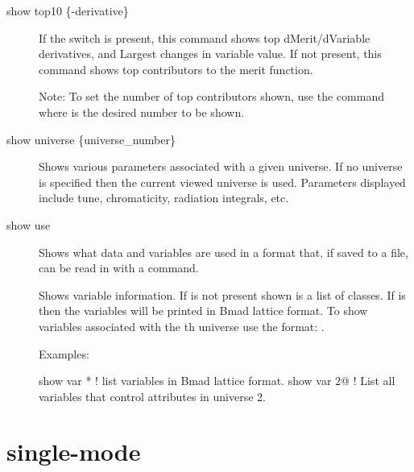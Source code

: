 {{{{\begin{description}
  \item[show top10 \{-derivative\}] \Newline
If the  switch is present, this command shows top
dMerit/dVariable derivatives, and Largest changes in variable value.
If not present, this command
shows top contributors to the merit function.

Note: To set the number of top contributors shown, use the command
 where  is the desired number to
be shown.



  \item[show universe \{universe\_number\}] \Newline
Shows various parameters associated with a given universe. If no
universe is specified then the current viewed universe is
used. Parameters displayed include tune, chromaticity, radiation
integrals, etc.


  \item[show use] \Newline
Shows what data and variables are used in a format that, if saved to a file, can
be read in with a  command.


  \item[\protect\parbox{6in}{
        show variable \{<var\_name> <locations>\} \\
        show variable <universe\_number>@}] \Newline
Shows variable information. If   is not
present shown is a list of  classes. If  is
\vn{*} then the variables will be printed in Bmad lattice format.
To show variables associated with the th universe use
the format: .

Examples:
\begin{example}
  show var *         ! list variables in Bmad lattice format.
  show var 2@        ! List all variables that control attributes in universe 2.
\end{example}

\end{description}

\section{single-mode}
\label{s:sing}

}}}}

